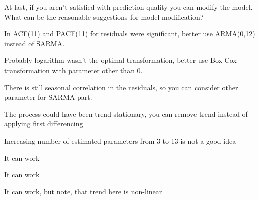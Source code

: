 
\begin{question}
At last, if you aren't satisfied with prediction quality you can modify the model.
What can be the reasonable suggestions for model modification?
\begin{answerlist}
  \item In ACF(11) and PACF(11) for residuals were significant, better use ARMA(0,12) instead of SARMA.
  \item Probably logarithm wasn't the optimal transformation, better use Box-Cox transformation with parameter other than 0.
  \item There is still seasonal correlation in the residuals, so you can consider other parameter for SARMA part.
  \item The process could have been trend-stationary, you can remove trend instead of applying first differencing
\end{answerlist}
\end{question}

\begin{solution}
\begin{answerlist}
  \item Increasing number of estimated parameters from 3 to 13 is not a good idea
  \item It can work
  \item It can work
  \item It can work, but note, that trend here is non-linear
\end{answerlist}
\end{solution}

